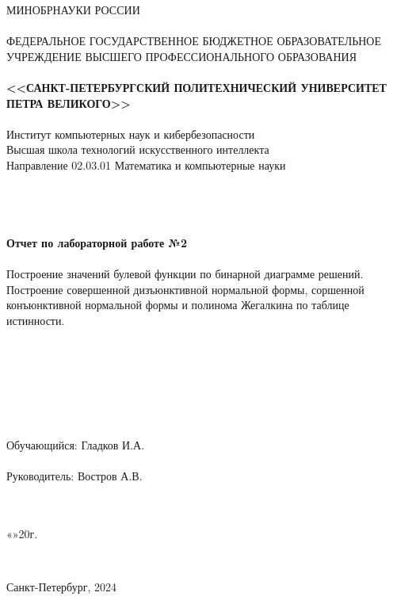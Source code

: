\documentclass[10pt,a4paper,final]{article} %
\begin{document}
	\thispagestyle{empty}
	
	\begin{center}
		{\Large МИНОБРНАУКИ РОССИИ}\\
		~\\
		{\large ФЕДЕРАЛЬНОЕ ГОСУДАРСТВЕННОЕ БЮДЖЕТНОЕ ОБРАЗОВАТЕЛЬНОЕ УЧРЕЖДЕНИЕ ВЫСШЕГО ПРОФЕССИОНАЛЬНОГО ОБРАЗОВАНИЯ}\\
		~\\
		{\Large \bf <<САНКТ-ПЕТЕРБУРГСКИЙ ПОЛИТЕХНИЧЕСКИЙ УНИВЕРСИТЕТ ПЕТРА ВЕЛИКОГО>>}\\
		~\\
		{\large Институт компьютерных наук и кибербезопасности}\\
				{\large Высшая школа технологий искусственного интеллекта}\\
		{\large Направление 02.03.01 Математика и компьютерные науки}\\
		~\\
		~\\
		~\\
		~\\
		{\Large \bf Отчет по лабораторной работе №2}\\
		~\\
		{\Large  Построение значений булевой функции по бинарной диаграмме решений. Построение совершенной дизъюнктивной нормальной формы, соршенной конъюнктивной нормальной формы и полинома Жегалкина по таблице истинности.}\\
		~\\
		~\\
		~\\
		~\\
		~\\
		~\\
		~\\
		{\large Обучающийся: \underline{\hspace{3.5cm}} \qquad\qquad Гладков И.А.}\\
		~\\
		{\large Руководитель: \underline{\hspace{3.5cm}} \hspace{14mm} Востров А.В.}\\
		~\\
		~\\
	\end{center}
	\begin{flushright}
		
		«\underline{\hspace{1cm}}»\underline{\hspace{3cm}}20\underline{\hspace{0.7cm}}г.
	\end{flushright}
	~\\
	\begin{center}
		{\large Санкт-Петербург, 2024}
	\end{center}
	\newpage
	
\end{document}
